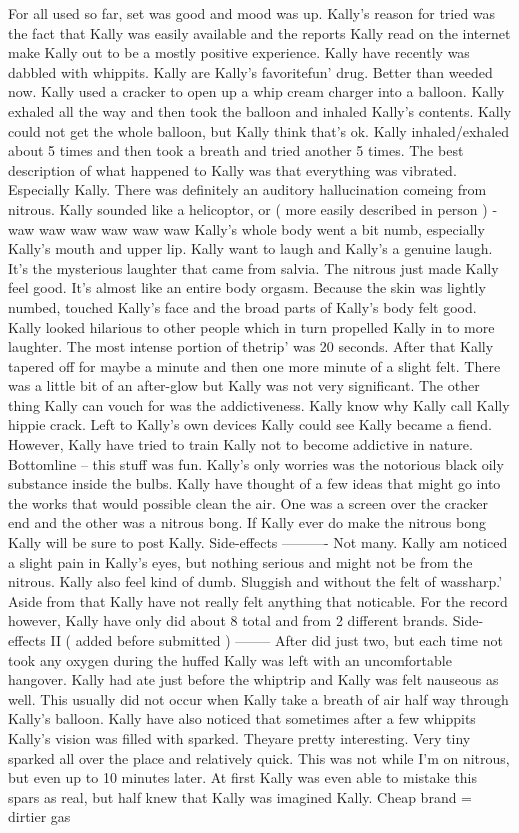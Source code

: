 \documentclass[12pt]{book}
\begin{document}
For all used so far, set was good and mood was up. Kally's reason for tried was the fact that Kally was easily available and the reports Kally read on the internet make Kally out to be a mostly positive experience. Kally have recently was dabbled with whippits. Kally are Kally's favoritefun' drug. Better than weeded now. Kally used a cracker to open up a whip cream charger into a balloon. Kally exhaled all the way and then took the balloon and inhaled Kally's contents. Kally could not get the whole balloon, but Kally think that's ok. Kally inhaled/exhaled about 5 times and then took a breath and tried another 5 times. The best description of what happened to Kally was that everything was vibrated. Especially Kally. There was definitely an auditory hallucination comeing from nitrous. Kally sounded like a helicoptor, or ( more easily described in person ) - waw waw waw waw waw waw Kally's whole body went a bit numb, especially Kally's mouth and upper lip. Kally want to laugh and Kally's a genuine laugh. It's the mysterious laughter that came from salvia. The nitrous just made Kally feel good. It's almost like an entire body orgasm. Because the skin was lightly numbed, touched Kally's face and the broad parts of Kally's body felt good. Kally looked hilarious to other people which in turn propelled Kally in to more laughter. The most intense portion of thetrip' was 20 seconds. After that Kally tapered off for maybe a minute and then one more minute of a slight felt. There was a little bit of an after-glow but Kally was not very significant. The other thing Kally can vouch for was the addictiveness. Kally know why Kally call Kally hippie crack. Left to Kally's own devices Kally could see Kally became a fiend. However, Kally have tried to train Kally not to become addictive in nature. Bottomline -- this stuff was fun. Kally's only worries was the notorious black oily substance inside the bulbs. Kally have thought of a few ideas that might go into the works that would possible clean the air. One was a screen over the cracker end and the other was a nitrous bong. If Kally ever do make the nitrous bong Kally will be sure to post Kally. Side-effects ---------- Not many. Kally am noticed a slight pain in Kally's eyes, but nothing serious and might not be from the nitrous. Kally also feel kind of dumb. Sluggish and without the felt of wassharp.' Aside from that Kally have not really felt anything that noticable. For the record however, Kally have only did about 8 total and from 2 different brands. Side-effects II ( added before submitted ) -------- After did just two, but each time not took any oxygen during the huffed Kally was left with an uncomfortable hangover. Kally had ate just before the whiptrip and Kally was felt nauseous as well. This usually did not occur when Kally take a breath of air half way through Kally's balloon. Kally have also noticed that sometimes after a few whippits Kally's vision was filled with sparked. Theyare pretty interesting. Very tiny sparked all over the place and relatively quick. This was not while I'm on nitrous, but even up to 10 minutes later. At first Kally was even able to mistake this spars as real, but half knew that Kally was imagined Kally. Cheap brand = dirtier gas
\end{document}
